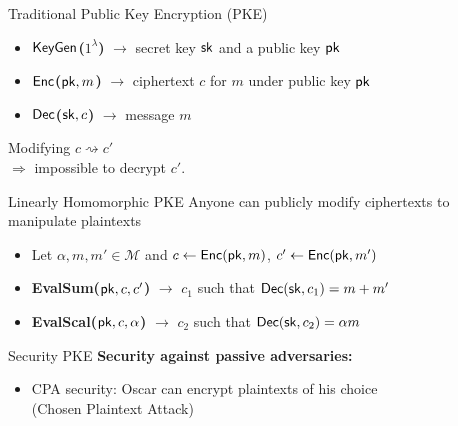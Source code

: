 \begin{frame}{Traditional Public Key Encryption (PKE)}
\begin{itemize}
\item \textcolor{mLightBrown}{\textbf{$\mathsf{KeyGen}$($1^\lambda$)}} $\rightarrow$ secret key $\mathsf{sk}$ and a public key $\mathsf{pk}$
\item \textcolor{mLightBrown}{\textbf{$\mathsf{Enc}$($\mathsf{pk},m$)}} $\rightarrow$ ciphertext $c$ for $m$ under public key $\mathsf{pk}$
\item \textcolor{mLightBrown}{\textbf{$\mathsf{Dec}$($\mathsf{sk},c$)}} $\rightarrow$ message $m$
\end{itemize}
Modifying $c \rightsquigarrow c'$ \\
\hspace{1cm} $\Rightarrow$ impossible to decrypt $c'$.
\end{frame}

\begin{frame}{Linearly Homomorphic PKE}
Anyone can publicly modify ciphertexts to manipulate plaintexts
\begin{itemize}
\item Let $\alpha, m, m'\in \mathcal{M}$ and $c \gets \mathsf{Enc}(\mathsf{pk},m)$, $c'\gets \mathsf{Enc}(\mathsf{pk}, m')$
\item \textcolor{mLightBrown}{\textbf{EvalSum($\mathsf{pk}, c, c'$)}} $\rightarrow$ $c_1$ such that $\mathsf{Dec}(\mathsf{sk},c_1)=m+m'$
\item \textcolor{mLightBrown}{\textbf{EvalScal($\mathsf{pk}, c, \alpha$)}} $\rightarrow$ $c_2$ such that $\mathsf{Dec}(\mathsf{sk},c_2)=\alpha m$
\end{itemize}
\end{frame}

\begin{frame}{Security PKE}
\textbf{Security against passive adversaries:}
\begin{itemize}
\item CPA security: Oscar can encrypt plaintexts of his choice \\(Chosen Plaintext Attack)
\end{itemize}
\end{frame}

